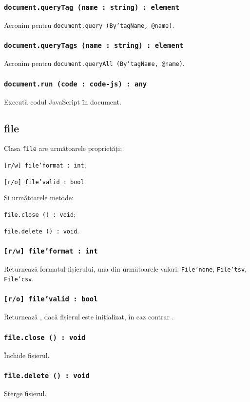 \subsubsection{\texttt{document.queryTag (name : string) : element}}

Acronim pentru \texttt{document.query (By'tagName, @name)}.

\subsubsection{\texttt{document.queryTags (name : string) : element}}

Acronim pentru \texttt{document.queryAll (By'tagName, @name)}.

\subsubsection{\texttt{document.run (code : code-js) : any}}

Execută codul JavaScript în document.

\subsection{file}

Clasa \texttt{file} are următoarele proprietăți:
\begin{icItems}
	\item \texttt{[r/w] file'format : int};
	\item \texttt{[r/o] file'valid : bool}.
\end{icItems}

Și următoarele metode:
\begin{icItems}
	\item \texttt{file.close () : void};
	\item \texttt{file.delete () : void}.
\end{icItems}

\subsubsection{\texttt{[r/w] file'format : int}}

Returnează formatul fișierului, una din următoarele valori: \texttt{File'none}, \texttt{File'tsv}, \texttt{File'csv}.

\subsubsection{\texttt{[r/o] file'valid : bool}}

Returnează \true, dacă fișierul este inițializat, în caz contrar \false.

\subsubsection{\texttt{file.close () : void}}

Închide fișierul.

\subsubsection{\texttt{file.delete () : void}}

Șterge fișierul.
